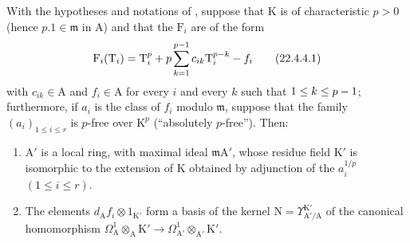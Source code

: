 \begin{proposition}[22.4.4]
\label{0.22.4.4}
With the hypotheses and notations of , suppose that $\mathrm{K}$ is of characteristic $p>0$ (hence $p.1\in\mathfrak{m}$ in $\mathrm{A}$) and that the $\mathrm{F}_i$ are of the form
\[
\label{0.22.4.4.1}
  \mathrm{F}_i(\mathrm{T}_i)=\mathrm{T}_i^p+p\sum_{k=1}^{p-1}c_{ik}\mathrm{T}_i^{p-k}- f_i
  \tag{22.4.4.1}
\]
with $c_{ik}\in\mathrm{A}$ and $f_i\in\mathrm{A}$ for every $i$ and every $k$ such that $1\leq k\leq p- 1$; furthermore, if $a_i$ is the class of $f_i$ \textup{modulo} $\mathfrak{m}$, suppose that the family $(a_i)_{1\leq i\leq r}$ is $p$-free over $\mathrm{K}^p$ \textup{(``absolutely $p$-free'')}.
Then:
\begin{enumerate}
  \item[\rm{(i)}] $\mathrm{A}'$ is a local ring, with maximal ideal $\mathfrak{m}\mathrm{A}'$, whose residue field $\mathrm{K}'$ is isomorphic to the extension of $\mathrm{K}$ obtained by adjunction of the $a_i^{1/p}$ $(1\leq i\leq r)$.


  \item[\rm{(ii)}] The elements $d_\mathrm{A}f_i\otimes 1_{\mathrm{K}'}$ form a basis of the kernel $\mathrm{N}=\Upsilon^{\mathrm{K}'}_{\mathrm{A}'/\mathrm{A}}$ of the canonical homomorphism $\Omega^1_\mathrm{A}\otimes_\mathrm{A}\mathrm{K}'
\longrightarrow\Omega^1_{\mathrm{A}'}\otimes_{\mathrm{A}'}\mathrm{K}'$.
\end{enumerate}
\end{proposition}

